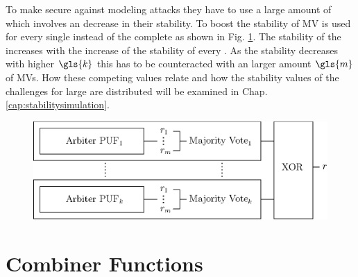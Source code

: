 To make \xpuf secure against modeling attacks they have to use a large amount of \apufs which involves an decrease in their stability.
To boost the stability of \xpufs \ac{MV} is used for every single \apuf instead of the complete \xpuf as shown in Fig. \ref{fig:majorityxorarbiter}.
The stability of the \xpuf increases with the increase of the stability of every \mpuf.
As the stability decreases with higher $\gls{k}$ this has to be counteracted with an larger amount $\gls{m}$ of \acp{MV}.
How these competing values relate and how the stability values of the challenges for large \mxpufs are distributed will be examined in Chap. \ref{cap:stabilitysimulation}.

\begin{figure}[ht]
\centering
\includegraphics[width=1.00\textwidth]{images/majority_xor_arbiter_v2.eps}
\caption[Majority \acs{XOR} \apuf]{\mxpuf}
\label{fig:majorityxorarbiter}
\end{figure}


\section{Combiner Functions}
\label{sec:combinerfunctions}

